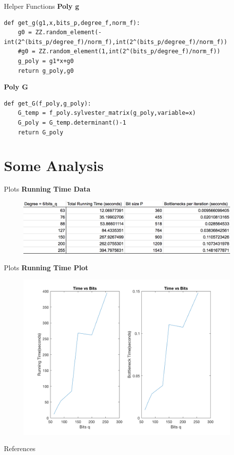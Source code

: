 \documentclass[10pt]{beamer}
\begin{document}
\begin{frame}[fragile]{Helper Functions}
\textbf{Poly g}
 \begin{lstlisting}
def get_g(g1,x,bits_p,degree_f,norm_f):
    g0 = ZZ.random_element(-int(2^(bits_p/degree_f)/norm_f),int(2^(bits_p/degree_f)/norm_f))
    #g0 = ZZ.random_element(1,int(2^(bits_p/degree_f)/norm_f))
    g_poly = g1*x+g0
    return g_poly,g0
        \end{lstlisting}
\textbf{Poly G}
\begin{lstlisting}
def get_G(f_poly,g_poly):
    G_temp = f_poly.sylvester_matrix(g_poly,variable=x)
    G_poly = G_temp.determinant()-1
    return G_poly   
\end{lstlisting}
\end{frame}

%
%
\section{Some Analysis}

\begin{frame}[fragile]{Plots}
\textbf{Running Time Data}
\begin{figure}[H]
  \includegraphics[width=\linewidth]{Data.png}
\endminipage
\end{figure}
\end{frame}


\begin{frame}[fragile]{Plots}
\textbf{Running Time Plot}
\begin{figure}[H]
  \includegraphics[width=\linewidth]{together.png}
\endminipage
\end{figure}
\end{frame}




\begin{frame}[allowframebreaks]{References}

  
  

\end{frame}
\end{document}
